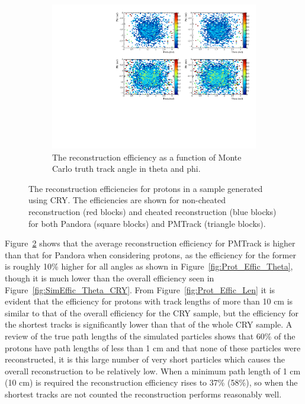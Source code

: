 \begin{figure}[h!]
\begin{subfigure}{.45\textwidth}
        \centering
        \includegraphics[width=\textwidth]{Effic_ProtonEnrich_500V_Proton_PhiTheta}
        \caption{The reconstruction efficiency as a function of Monte Carlo truth track angle in theta and phi.}
        \label{fig:Prot_Effic_PhiTheta}
  \end{subfigure}
  \caption[The reconstruction efficiencies for protons in a sample generated using CRY.]
          {The reconstruction efficiencies for protons in a sample generated using CRY. The efficiencies are shown for non-cheated reconstruction (red blocks) and cheated reconstruction (blue blocks) for both Pandora (square blocks) and PMTrack (triangle blocks).}
  \label{fig:Prot_Effic}
\end{figure}

Figure~\ref{fig:Prot_Effic} shows that the average reconstruction efficiency for PMTrack is higher than that for Pandora when considering protons, as the efficiency for the former is roughly 10\% higher for all angles as shown in Figure~\ref{fig:Prot_Effic_Theta}, though it is much lower than the overall efficiency seen in Figure~\ref{fig:SimEffic_Theta_CRY}. From Figure~\ref{fig:Prot_Effic_Len} it is evident that the efficiency for protons with track lengths of more than 10 cm is similar to that of the overall efficiency for the CRY sample, but the efficiency for the shortest tracks is significantly lower than that of the whole CRY sample. A review of the true path lengths of the simulated particles shows that 60\% of the protons have path lengths of less than 1 cm and that none of these particles were reconstructed, it is this large number of very short particles which causes the overall reconstruction to be relatively low. When a minimum path length of 1 cm (10 cm) is required the reconstruction efficiency rises to 37\% (58\%), so when the shortest tracks are not counted the reconstruction performs reasonably well. \\

